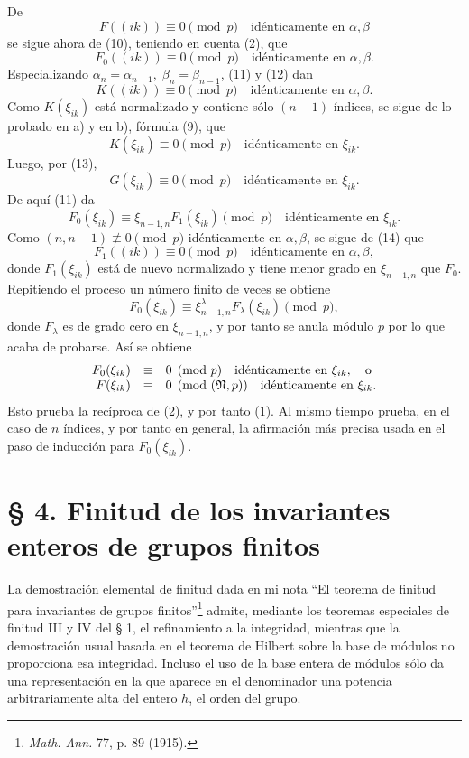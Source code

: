 De
\[
        F((ik))\equiv0\pmod p\quad \text{idénticamente en \(\alpha,\beta\)}
\]
se sigue ahora de (10), teniendo en cuenta (2), que
\begin{equation}
        F_0((ik))\equiv0\pmod p\quad \text{idénticamente en \(\alpha,\beta\)}.
\end{equation}
Especializando \(\alpha_n=\alpha_{n-1},\;\beta_n=\beta_{n-1}\), (11) y (12) dan
\begin{equation}
        K((ik))\equiv0\pmod p\quad \text{idénticamente en \(\alpha,\beta\)}.
\end{equation}
Como \(K(\xi_{ik})\) está normalizado y contiene sólo \((n-1)\) índices, se sigue de lo probado en a) y en b), fórmula (9), que
\[
        K(\xi_{ik})\equiv0\pmod p\quad \text{idénticamente en \(\xi_{ik}\)}.
\]
Luego, por (13),
\[
        G(\xi_{ik})\equiv0\pmod p\quad \text{idénticamente en \(\xi_{ik}\)}.
\]
De aquí (11) da
\[
        F_0(\xi_{ik})\equiv \xi_{n-1,n}F_1(\xi_{ik})\pmod p
        \quad \text{idénticamente en \(\xi_{ik}\)}.
\]
Como \((n,n-1)\not\equiv0\pmod p\) idénticamente en \(\alpha,\beta\), se sigue de (14) que
\[
        F_1((ik))\equiv0\pmod p\quad \text{idénticamente en \(\alpha,\beta\)},
\]
donde \(F_1(\xi_{ik})\) está de nuevo normalizado y tiene menor grado en \(\xi_{n-1,n}\) que \(F_0\). Repitiendo el proceso un número finito de veces se obtiene
\[
        F_0(\xi_{ik})\equiv\xi_{n-1,n}^{\lambda}F_\lambda(\xi_{ik})\pmod p,
\]
donde \(F_\lambda\) es de grado cero en \(\xi_{n-1,n}\), y por tanto se anula módulo \(p\) por lo que acaba de probarse. Así se obtiene
\begin{equation}
\begin{array}{rcl}
        F_0(\xi_{ik})&\equiv&0\pmod p\quad \text{idénticamente en \(\xi_{ik}\)},\quad\text{o}\\
        F(\xi_{ik})&\equiv&0\pmod{(\mathfrak N,p)}\quad \text{idénticamente en \(\xi_{ik}\)}.
\end{array}
\end{equation}
Esto prueba la recíproca de (2), y por tanto (1). Al mismo tiempo prueba, en el caso de \(n\) índices, y por tanto en general, la afirmación más precisa usada en el paso de inducción para \(F_0(\xi_{ik})\).

\setcounter{equation}{0}
\section*{§ 4. Finitud de los invariantes enteros de grupos finitos}

La demostración elemental de finitud dada en mi nota ``El teorema de finitud para invariantes de grupos finitos''\footnote{\emph{Math. Ann.} 77, p. 89 (1915).} admite, mediante los teoremas especiales de finitud III y IV del § 1, el refinamiento a la integridad, mientras que la demostración usual basada en el teorema de Hilbert sobre la base de módulos no proporciona esa integridad. Incluso el uso de la base entera de módulos sólo da una representación en la que aparece en el denominador una potencia arbitrariamente alta del entero \(h\), el orden del grupo.

